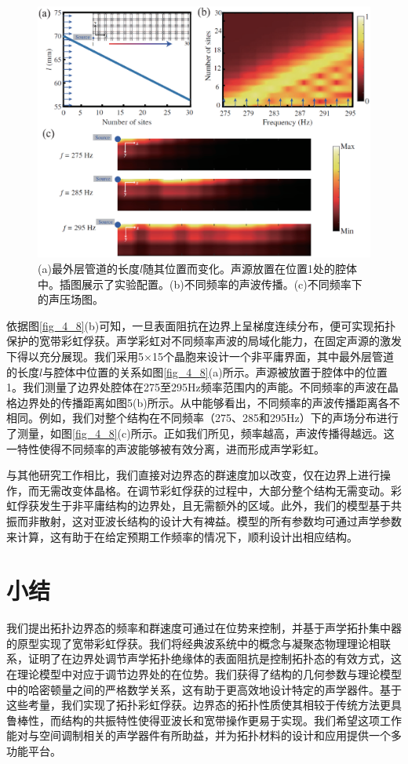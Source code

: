 \begin{figure}[h!]
    \centering
    \includegraphics[width=1\textwidth]{images/fig4-9.eps} 
    \caption{(a)最外层管道的长度$l$随其位置而变化。声源放置在位置1处的腔体中。插图展示了实验配置。(b)不同频率的声波传播。(c)不同频率下的声压场图。}
    \label{fig_4_9}
\end{figure} 

依据图\ref{fig_4_8}(b)可知，一旦表面阻抗在边界上呈梯度连续分布，便可实现拓扑保护的宽带彩虹俘获\cite{C41-1,C41-2,C41-3}。声学彩虹对不同频率声波的局域化能力，在固定声源的激发下得以充分展现。我们采用5×15个晶胞来设计一个非平庸界面，其中最外层管道的长度$l$与腔体中位置的关系如图\ref{fig_4_8}(a)所示。声源被放置于腔体中的位置1。我们测量了边界处腔体在275至295Hz频率范围内的声能。不同频率的声波在晶格边界处的传播距离如图5(b)所示。从中能够看出，不同频率的声波传播距离各不相同。例如，我们对整个结构在不同频率（275、285和295Hz）下的声场分布进行了测量，如图\ref{fig_4_8}(c)所示。正如我们所见，频率越高，声波传播得越远。这一特性使得不同频率的声波能够被有效分离，进而形成声学彩虹。

与其他研究工作相比，我们直接对边界态的群速度加以改变，仅在边界上进行操作，而无需改变体晶格。在调节彩虹俘获的过程中，大部分整个结构无需变动。彩虹俘获发生于非平庸结构的边界处，且无需额外的区域。此外，我们的模型基于共振而非散射，这对亚波长结构的设计大有裨益。模型的所有参数均可通过声学参数来计算，这有助于在给定预期工作频率的情况下，顺利设计出相应结构。

\section{小结}

我们提出拓扑边界态的频率和群速度可通过在位势来控制，并基于声学拓扑集中器的原型实现了宽带彩虹俘获。我们将经典波系统中的概念与凝聚态物理理论相联系，证明了在边界处调节声学拓扑绝缘体的表面阻抗是控制拓扑态的有效方式，这在理论模型中对应于调节边界处的在位势。我们获得了结构的几何参数与理论模型中的哈密顿量之间的严格数学关系，这有助于更高效地设计特定的声学器件。基于这些考量，我们实现了拓扑彩虹俘获。边界态的拓扑性质使其相较于传统方法更具鲁棒性，而结构的共振特性使得亚波长和宽带操作更易于实现。我们希望这项工作能对与空间调制相关的声学器件有所助益，并为拓扑材料的设计和应用提供一个多功能平台。